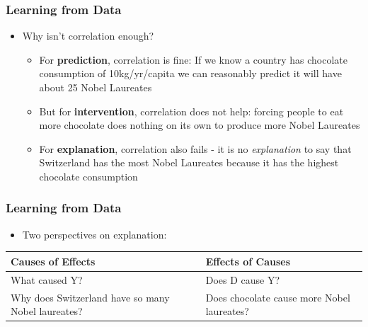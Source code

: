 \documentclass[xcolor=x11names,compress]{beamer}\usepackage[]{graphicx}\usepackage[]{color}
\renewcommand{\(}{\begin{columns}}
\renewcommand{\)}{\end{columns}}
\newcommand{\<}[1]{\begin{column}{#1}}
\renewcommand{\>}{\end{column}}
\begin{document}
\begin{frame}
\frametitle{Learning from Data}
\small
\begin{itemize}
\item Why isn't correlation enough?
\pause
\begin{itemize}
\item For \textbf{prediction}, correlation is fine: If we know a country has chocolate consumption of 10kg/yr/capita we can reasonably predict it will have about 25 Nobel Laureates
\pause
\item But for \textbf{intervention}, correlation does not help: forcing people to eat more chocolate does nothing on its own to produce more Nobel Laureates
\pause
\item For \textbf{explanation}, correlation also fails - it is no \textit{explanation} to say that Switzerland has the most Nobel Laureates because it has the highest chocolate consumption
\end{itemize}
\end{itemize}
\normalsize
\end{frame}

\begin{frame}
\frametitle{Learning from Data}
\begin{itemize}
\item Two perspectives on explanation:
\end{itemize}
\pause
\begin{table}[htbp]
  \centering
    \begin{tabular}{|>{\raggedright}p{5cm}|p{5cm}|}
    \toprule
    \textbf{Causes of Effects} & \textbf{Effects of Causes} \\
    \midrule
    What caused Y? & Does D cause Y? \\
    \midrule
    Why does Switzerland have so many Nobel laureates? & Does chocolate cause more Nobel laureates? \\
    \bottomrule
    \end{tabular}%
  \label{tab:addlabel}%
\end{table}%
\end{frame}
\end{document}
